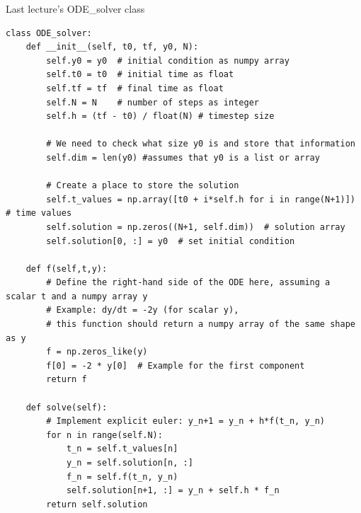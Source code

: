 \documentclass{beamer}
\begin{document}
  \begin{frame}[fragile]{Last lecture's ODE\_solver class}
    \begin{verbatim}
class ODE_solver:
    def __init__(self, t0, tf, y0, N):
        self.y0 = y0  # initial condition as numpy array
        self.t0 = t0  # initial time as float
        self.tf = tf  # final time as float
        self.N = N    # number of steps as integer
        self.h = (tf - t0) / float(N) # timestep size

        # We need to check what size y0 is and store that information
        self.dim = len(y0) #assumes that y0 is a list or array

        # Create a place to store the solution
        self.t_values = np.array([t0 + i*self.h for i in range(N+1)])  # time values
        self.solution = np.zeros((N+1, self.dim))  # solution array
        self.solution[0, :] = y0  # set initial condition
        
    def f(self,t,y):
        # Define the right-hand side of the ODE here, assuming a scalar t and a numpy array y
        # Example: dy/dt = -2y (for scalar y),
        # this function should return a numpy array of the same shape as y
        f = np.zeros_like(y)
        f[0] = -2 * y[0]  # Example for the first component
        return f
    
    def solve(self):
        # Implement explicit euler: y_n+1 = y_n + h*f(t_n, y_n)
        for n in range(self.N):
            t_n = self.t_values[n]
            y_n = self.solution[n, :]
            f_n = self.f(t_n, y_n)
            self.solution[n+1, :] = y_n + self.h * f_n
        return self.solution
    \end{verbatim}
\end{frame}
\end{document}
